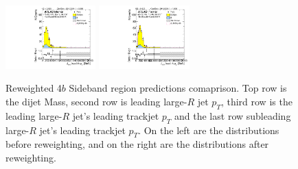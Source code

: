 \begin{figure}[htbp!]
\begin{center}
\includegraphics[width=0.31\textwidth,angle=-90]{figures/boosted/Prereweight/Moriond_FourTag_Sideband_sublHCand_trk0_Pt.pdf}
\includegraphics[width=0.31\textwidth,angle=-90]{figures/boosted/Sideband/b77_FourTag_Sideband_sublHCand_trk0_Pt.pdf}\\
\caption{Reweighted 4$b$ Sideband region predictions comaprison. Top row is the dijet Mass, second row is leading large-$R$ jet $p_{T}$, third row is the leading large-$R$ jet's leading trackjet $p_T$ and the last row subleading large-$R$ jet's leading trackjet $p_T$. On the left are the distributions before reweighting, and on the right are the distributions after reweighting.}
\label{fig:rw-4b-comp-sb}
\end{center}
\end{figure}



